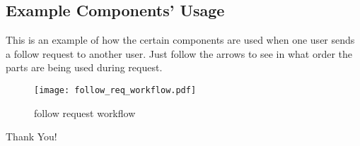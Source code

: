 \documentclass{article}
\begin{document}
\newpage

    \subsection{Example Components' Usage}

    This is an example of how the certain components are used when one user sends a follow request to another user. Just follow the arrows to see in what order the parts are being used during request.

    \begin{figure}[ht]
         \centering
         \texttt{[image: follow\_req\_workflow.pdf]}
         \caption{follow request workflow}
         \label{fig:screen_follow_req_workflow}
    \end{figure}

\newpage
{}

\clearpage
\vspace*{\fill}
\begin{center}
    \begin{minipage}{0.4\textwidth}
        \fontsize{28}{12}\selectfont
        Thank You!
    \end{minipage}
\end{center}
\vfill
\clearpage
\end{document}
